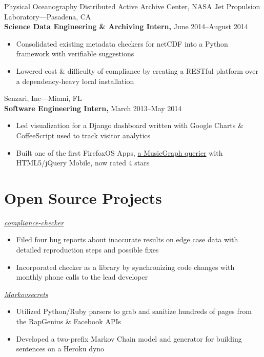 \documentclass[letterpaper,12pt]{article}
\begin{document}
Physical Oceanography Distributed Active Archive Center, NASA Jet Propulsion Laboratory---Pasadena, CA\\
\textbf{Science Data Engineering \& Archiving Intern,} June 2014--August 2014
\begin{itemize}
  \item Consolidated existing metadata checkers for netCDF into a Python framework with verifiable suggestions
  \item Lowered cost \& difficulty of compliance by creating a RESTful platform over a dependency-heavy local installation
\end{itemize}

Senzari, Inc---Miami, FL\\
\textbf{Software Engineering Intern,} March 2013--May 2014
\begin{itemize}
  \item Led visualization for a Django dashboard written with Google Charts \& CoffeeScript used to track visitor analytics
  \item Built one of the first FirefoxOS Apps, \href{https://marketplace.firefox.com/app/music-graph-1}{a MusicGraph querier} with HTML5/jQuery Mobile, now rated 4 stars
\end{itemize}

\vskip 2.5mm


\section*{Open Source Projects}

\textit{\href{https://github.com/ioos/compliance-checker}{compliance-checker}}
\begin{itemize}
  \item Filed four bug reports about inaccurate results on edge case data with detailed reproduction steps and possible fixes
  \item Incorporated checker as a library by synchronizing code changes with monthly phone calls to the lead developer
\end{itemize}

\textit{\href{https://github.com/oychang/Markovsecrets}{Markovsecrets}}
\begin{itemize}
  \item Utilized Python/Ruby parsers to grab and sanitize hundreds of pages from the RapGenius \& Facebook APIs
  \item Developed a two-prefix Markov Chain model and generator for building sentences on a Heroku dyno
\end{itemize}
\end{document}
